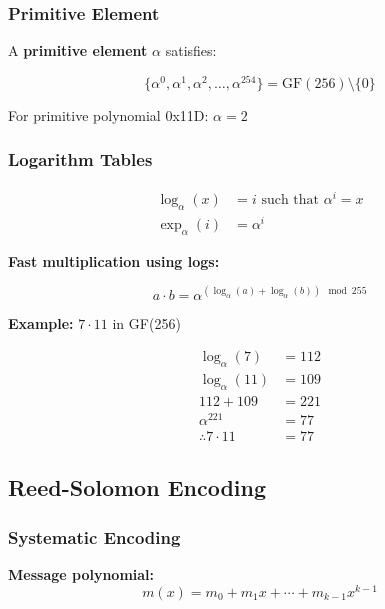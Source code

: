 \documentclass[11pt,a4paper]{article}
\begin{document}
\subsubsection{Primitive Element}

A \textbf{primitive element} $\alpha$ satisfies:

\begin{equation}
\{\alpha^0, \alpha^1, \alpha^2, \ldots, \alpha^{254}\} = \text{GF}(256) \setminus \{0\}
\end{equation}

For primitive polynomial 0x11D: $\alpha = 2$

\subsubsection{Logarithm Tables}

\begin{align}
\log_\alpha(x) &= i \text{ such that } \alpha^i = x \\
\exp_\alpha(i) &= \alpha^i
\end{align}

\textbf{Fast multiplication using logs:}

\begin{equation}
a \cdot b = \alpha^{(\log_\alpha(a) + \log_\alpha(b)) \mod 255}
\end{equation}

\textbf{Example:} $7 \cdot 11$ in GF(256)

\begin{align}
\log_\alpha(7) &= 112 \\
\log_\alpha(11) &= 109 \\
112 + 109 &= 221 \\
\alpha^{221} &= 77 \\
\therefore 7 \cdot 11 &= 77
\end{align}

\subsection{Reed-Solomon Encoding}

\subsubsection{Systematic Encoding}

\textbf{Message polynomial:}
\begin{equation}
m(x) = m_0 + m_1 x + \cdots + m_{k-1}x^{k-1}
\end{equation}
\end{document}
